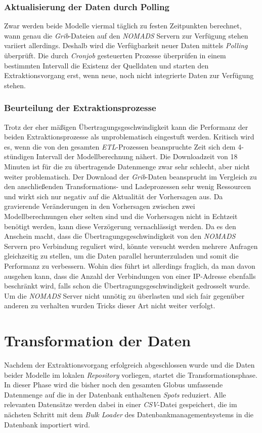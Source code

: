 \subsubsection{Aktualisierung der Daten durch Polling}
Zwar werden beide Modelle viermal täglich zu festen Zeitpunkten
berechnet, wann genau die \textit{Grib}-Dateien auf den
\textit{NOMADS} Servern zur Verfügung stehen variiert
allerdings. Deshalb wird die Verfügbarkeit neuer Daten mittels
\textit{Polling} überprüft. Die durch \textit{Cronjob} gesteuerten
Prozesse überprüfen in einem bestimmten Intervall die Existenz der
Quelldaten und starten den Extraktionsvorgang erst, wenn neue, noch
nicht integrierte Daten zur Verfügung stehen.

\subsubsection{Beurteilung der Extraktionsprozesse}
Trotz der eher mäßigen Übertragungsgeschwindigkeit kann die Performanz
der beiden Extraktionsprozesse als unproblematisch eingestuft
werden. Kritisch wird es, wenn die von den gesamten
\textit{ETL}-Prozessen beanspruchte Zeit sich dem 4-stündigen
Intervall der Modellberechnung nähert. Die Downloadzeit von 18 Minuten
ist für die zu übertragende Datenmenge zwar sehr schlecht, aber nicht
weiter problematisch. Der Download der \textit{Grib}-Daten beansprucht
im Vergleich zu den anschließenden Transformations- und Ladeprozessen
sehr wenig Ressourcen und wirkt sich nur negativ auf die Aktualität
der Vorhersagen aus. Da gravierende Veränderungen in den Vorhersagen
zwischen zwei Modellberechnungen eher selten sind und die Vorhersagen
nicht in Echtzeit benötigt werden, kann diese Verzögerung
vernachlässigt werden. Da es den Anschein macht, dass die
Übertragungsgeschwindigkeit von den \textit{NOMADS} Servern pro
Verbindung reguliert wird, könnte versucht werden mehrere Anfragen
gleichzeitig zu stellen, um die Daten parallel herunterzuladen und
somit die Performanz zu verbessern. Wohin dies führt ist allerdings
fraglich, da man davon ausgehen kann, dass die Anzahl der Verbindungen
von einer IP-Adresse ebenfalls beschränkt wird, falls schon die
Übertragungsgeschwindigkeit gedrosselt wurde. Um die \textit{NOMADS}
Server nicht unnötig zu überlasten und sich fair gegenüber anderen zu
verhalten wurden Tricks dieser Art nicht weiter verfolgt.

\section{Transformation der Daten}
Nachdem der Extraktionsvorgang erfolgreich abgeschlossen wurde und die
Daten beider Modelle im lokalen \textit{Repository} vorliegen, startet
die Transformationsphase. In dieser Phase wird die bisher noch den
gesamten Globus umfassende Datenmenge auf die in der Datenbank
enthaltenen \textit{Spots} reduziert. Alle relevanten Datensätze
werden dabei in einer \textit{CSV}-Datei
 gespeichert, die im
nächsten Schritt mit dem \textit{Bulk Loader} des
Datenbankmanagementsystems in die Datenbank importiert wird.

